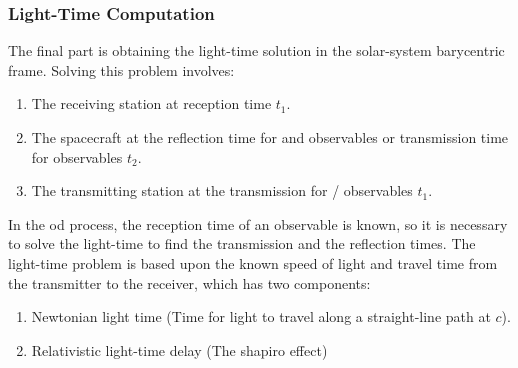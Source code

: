 \documentclass{article}
\begin{document}
                \subsubsection{\footnotesize{Light-Time Computation}}
                    The final part is obtaining the light-time
                    solution in the solar-system barycentric frame.
                    Solving this problem involves:
                    \begin{enumerate}
                        \item The receiving station at
                              reception time $t_1$.
                        \item The spacecraft at the reflection
                              time for
                              and
                              observables or transmission time for
                              observables $t_2$.
                        \item The transmitting station at the
                              transmission for
                              /
                              observables $t_1$.
                    \end{enumerate}
                    In the \gls{od} process, the reception time of
                    an observable is known, so it is necessary to
                    solve the light-time to find the transmission
                    and the reflection times. The light-time
                    problem is based upon the known speed of light
                    and travel time from the transmitter to the
                    receiver, which has two components:
                    \begin{enumerate}
                        \item Newtonian light time
                              (Time for light to travel along
                              a straight-line path at $c$).
                        \item Relativistic light-time delay
                              (The \gls{shapiro effect})
                    \end{enumerate}
\end{document}
